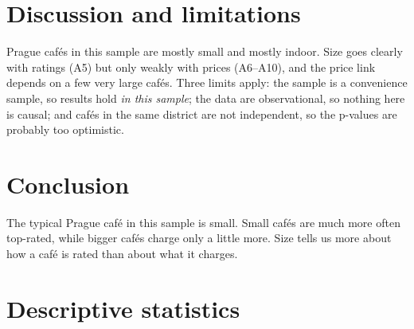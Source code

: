 \documentclass[11pt]{article}
\newcommand{\rtable}[1]{\resizebox{\ifdim\width>\textwidth\textwidth\else\width\fi}{!}{}}
\begin{document}
\section{Discussion and limitations}
Prague cafés in this sample are mostly small and mostly indoor. Size goes clearly with ratings (A5) but only weakly with prices (A6--A10), and the price link depends on a few very large cafés. Three limits apply: the sample is a convenience sample, so results hold \emph{in this sample}; the data are observational, so nothing here is causal; and cafés in the same district are not independent, so the p-values are probably too optimistic.

\section{Conclusion}
The typical Prague café in this sample is small. Small cafés are much more often top-rated, while bigger cafés charge only a little more. Size tells us more about how a café is rated than about what it charges.

\appendix
\section{Descriptive statistics}\label{app:desc}
\begin{table}[H]\centering\caption{Descriptive statistics of every variable and group used: n, missing values, mean, standard deviation, median, interquartile range, minimum and maximum.}\rtable{D_stats.tex}\end{table}
\begin{table}[H]\centering\caption{Yes/no variables: counts and the percentage of yes.}\rtable{D_categorical.tex}\end{table}
\end{document}
